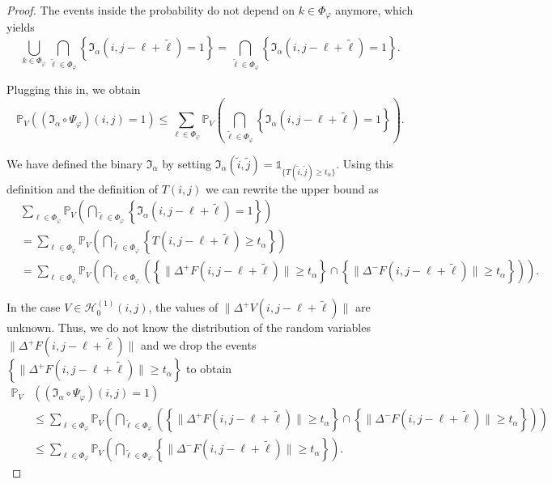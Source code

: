 \documentclass[a4paper,12pt]{article}
\newcommand{\norm}[1]{\lVert#1\rVert}
\theoremstyle{plain}
\theoremstyle{definition}
\begin{document}
\begin{proof}
	The events inside the probability do not depend on $k \in \Phi_\varphi$ anymore, which yields
	\begin{equation*}
		\bigcup_{k \in \Phi_\varphi} \bigcap_{\tilde{\ell} \in \Phi_\varphi} \left\{ \mathfrak{I}_\alpha(i, j - \ell + \tilde{\ell}) = 1 \right\} = \bigcap_{\tilde{\ell} \in \Phi_\varphi} \left\{ \mathfrak{I}_\alpha(i, j - \ell + \tilde{\ell}) = 1 \right\}.
	\end{equation*}
	
	Plugging this in, we obtain
	\begin{equation*}
		\mathbb{P}_V\left( (\mathfrak{I}_\alpha \circ \Psi_\varphi)(i, j) = 1 \right) \leq \sum_{\ell \in \Phi_\varphi} \mathbb{P}_V\left( \bigcap_{\tilde{\ell} \in \Phi_\varphi} \left\{ \mathfrak{I}_\alpha(i, j - \ell + \tilde{\ell}) = 1 \right\} \right).
	\end{equation*}
	
	We have defined the binary $\mathfrak{I}_\alpha$ by setting $\mathfrak{I}_\alpha(\tilde{i}, \tilde{j}) = \mathds{1}_{ \{ T(\tilde{i}, \tilde{j}) \geq t_\alpha \} }$. Using this definition and the definition of $T(i, j)$ we can rewrite the upper bound as
	\begin{align*}
		&\sum_{\ell \in \Phi_\varphi} \mathbb{P}_V\left( \bigcap_{\tilde{\ell} \in \Phi_\varphi} \left\{ \mathfrak{I}_\alpha(i, j - \ell + \tilde{\ell}) = 1 \right\} \right) \\
		&= \sum_{\ell \in \Phi_\varphi} \mathbb{P}_V\left( \bigcap_{\tilde{\ell} \in \Phi_\varphi} \left\{ T(i, j - \ell + \tilde{\ell}) \geq t_\alpha \right\} \right) \\
		&= \sum_{\ell \in \Phi_\varphi} \mathbb{P}_V\left( \bigcap_{\tilde{\ell} \in \Phi_\varphi} \left( \left\{ \norm{\Delta^+ F(i, j - \ell + \tilde{\ell})} \geq t_\alpha \right\} \cap \left\{ \norm{\Delta^- F(i, j - \ell + \tilde{\ell})} \geq t_\alpha \right\} \right) \right).
	\end{align*}
	
	In the case $V \in \mathcal{H}_0^{(1)}(i, j)$, the values of $\norm{\Delta^+ V(i, j - \ell + \tilde{\ell})}$ are unknown. Thus, we do not know the distribution of the random variables $\norm{\Delta^+ F(i, j - \ell + \tilde{\ell})}$ and we drop the events $\left\{ \norm{\Delta^+ F(i, j - \ell + \tilde{\ell})} \geq t_\alpha \right\}$ to obtain
	\begin{align*}
		\mathbb{P}_V&\left( (\mathfrak{I}_\alpha \circ \Psi_\varphi)(i, j) = 1 \right) \\
		&\leq \sum_{\ell \in \Phi_\varphi} \mathbb{P}_V\left( \bigcap_{\tilde{\ell} \in \Phi_\varphi} \left( \left\{ \norm{\Delta^+ F(i, j - \ell + \tilde{\ell})} \geq t_\alpha \right\} \cap \left\{ \norm{\Delta^- F(i, j - \ell + \tilde{\ell})} \geq t_\alpha \right\} \right) \right) \\
		&\leq \sum_{\ell \in \Phi_\varphi} \mathbb{P}_V\left( \bigcap_{\tilde{\ell} \in \Phi_\varphi} \left\{ \norm{\Delta^- F(i, j - \ell + \tilde{\ell})} \geq t_\alpha \right\} \right).
	\end{align*}
	

\end{proof}
\end{document}
